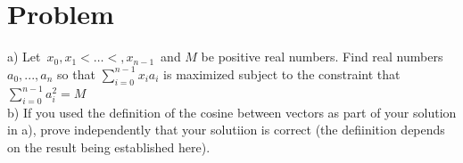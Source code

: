 \documentclass[11pt,a4paper]{report}
\theoremstyle{plain}
\theoremstyle{definition}
\theoremstyle{remark}
\begin{document}
\section*{Problem}
a)  Let $x_0 , x_1 < … < , x_{n-1}$ and $M$ be positive real numbers.  Find real numbers $a_0, ..., a_n$ so that $\sum_{i = 0}^{n-1} x_i a_i$ is maximized subject to the constraint that $\sum_{i = 0}^{n-1} a_i ^2 = M$
\\
b) If you used the definition of the cosine between vectors as part of your solution in a), prove independently that your solutiion is correct (the defiinition depends on the result being established here).
\end{document}
